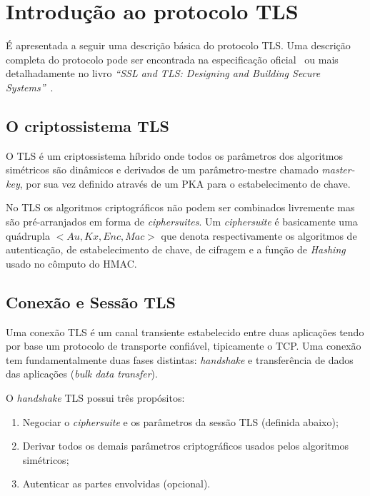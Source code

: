 
\chapter{Introdução ao protocolo TLS}

É apresentada a seguir uma descrição básica do protocolo TLS. Uma descrição
completa do protocolo pode ser encontrada na especificação
oficial~\cite{rfc_tls} ou mais detalhadamente no livro \emph{``SSL and
TLS: Designing and Building Secure Systems''}~\cite{Rescorla}.

\section{O criptossistema TLS}
\label{sec:OCriptossistemaTLS}

O TLS é um criptossistema híbrido onde todos os parâmetros dos algoritmos 
simétricos são dinâmicos e derivados de um parâmetro-mestre chamado \emph{master-key},
por sua vez definido através de um \acs{PKA} para o estabelecimento de chave.

No TLS os algoritmos criptográficos não podem ser combinados livremente mas
são pré-arranjados em forma de \emph{ciphersuites}.
Um \emph{ciphersuite} é basicamente uma quádrupla $<Au,Kx,Enc,Mac>$ que denota
respectivamente os algoritmos de autenticação, de estabelecimento de chave, 
de cifragem e a função de \emph{Hashing} usado no cômputo do \acs{HMAC}.

\section{Conexão e Sessão TLS}
\label{sec:ConexãoESessãoTLS}

Uma conexão TLS é um canal transiente estabelecido entre duas aplicações tendo por base 
um protocolo de transporte confiável, tipicamente o \acs{TCP}. Uma conexão tem
fundamentalmente duas fases distintas: \emph{handshake} e transferência de dados
das aplicações (\emph{bulk data transfer}).

O \emph{handshake} TLS possui três propósitos:
\begin{enumerate}
	\item Negociar o \emph{ciphersuite} e os parâmetros da sessão TLS (definida abaixo);
	\item Derivar todos os demais parâmetros criptográficos usados pelos algoritmos 
	simétricos;
	\item Autenticar as partes envolvidas (opcional).
\end{enumerate}

